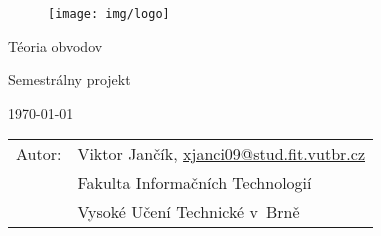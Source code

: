 \begin{titlepage}

\begin{figure}[!h]
  \centering
  \texttt{[image: img/logo]}
\end{figure}

\vfill

\begin{center}
\begin{Large}
Téoria obvodov\\
\end{Large}
\bigskip
\begin{Huge}
Semestrálny projekt\\
\end{Huge}
\end{center}

\vfill

\begin{center}
\begin{Large}
\today
\end{Large}
\end{center}

\vfill

\begin{flushleft}
\begin{large}
\begin{tabular}{ll}
Autor: 
 & Viktor Jančík, \url{xjanci09@stud.fit.vutbr.cz} \\
 & Fakulta Informačních Technologií \\
 & Vysoké Učení Technické v~Brně \\
\end{tabular}
\end{large}
\end{flushleft}
\end{titlepage}
